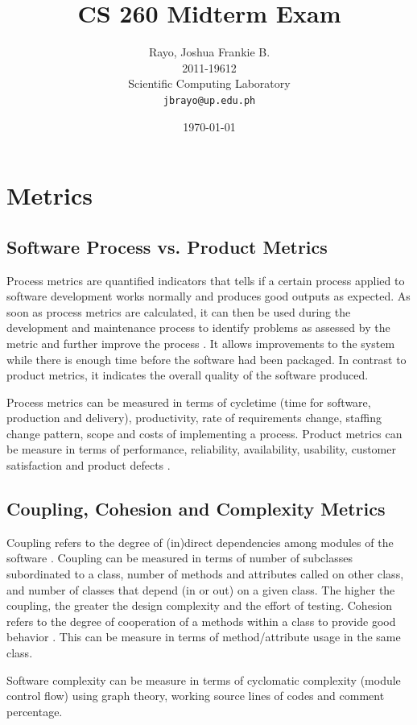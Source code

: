 \documentclass[a4paper, 11pt]{article}
\title{CS 260 Midterm Exam}
\author{
	Rayo, Joshua Frankie B.\\
	2011-19612\\
	Scientific Computing Laboratory\\
	\texttt{jbrayo@up.edu.ph}
}
\date{\today}
\begin{document}
\maketitle

\section{Metrics}
\subsection{Software Process vs. Product Metrics}
Process metrics are quantified indicators that tells if a certain process applied to software development works normally and produces good outputs as expected. As soon as process metrics are calculated, it can then be used during the development and maintenance process to identify problems as assessed by the metric and further improve the process \cite{metrics}. It allows improvements to the system while there is enough time before the software had been packaged. In contrast to product metrics, it indicates the overall quality of the software produced.

Process metrics can be measured in terms of cycletime (time for software, production and delivery), productivity, rate of requirements change, staffing change pattern, scope and costs of implementing a process. Product metrics can be measure in terms of performance, reliability, availability, usability, customer satisfaction and product defects \cite{metrics}.

\subsection{Coupling, Cohesion and Complexity Metrics}
Coupling refers to the degree of (in)direct dependencies among modules of the software \cite{coupling}. Coupling can be measured in terms of number of subclasses subordinated to a class, number of methods and attributes called on other class, and number of classes that depend (in or out) on a given class. The higher the coupling, the greater the design complexity and the effort of testing. Cohesion refers to the degree of cooperation of a methods within a class to provide good behavior \cite{coupling}. This can be measure in terms of method/attribute usage in the same class.

Software complexity can be measure in terms of cyclomatic complexity (module control flow) using graph theory, working source lines of codes and comment percentage.
\end{document}
